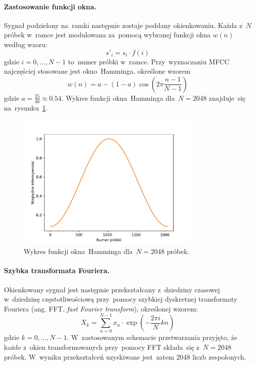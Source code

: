 \documentclass[11pt,a4paper]{article}
\begin{document}
\paragraph{Zastosowanie funkcji okna.}
Sygnał podzielony na~ramki następnie zostaje poddany okienkowaniu.
Każda z~$N$ próbek w~ramce jest modulowana za~pomocą wybranej funkcji okna $w(n)$ według wzoru:
$$ s'_i = s_i \cdot f(i) $$
gdzie $i = 0, \dots, N - 1$ to~numer próbki w~ramce.
Przy~wyznaczaniu MFCC najczęściej stosowane jest okno~Hamminga, określone wzorem
$$ w(n) = a - (1 - a) \cos \left( 2\pi \frac{n-1}{N-1} \right) $$
gdzie $a = \frac{25}{46} \approx 0.54$.
Wykres funkcji okna~Hamminga dla~$N = 2048$ znajduje~się na~rysunku~\ref{fig:hamming-window}.

\begin{figure}
    \centering
    \includegraphics[width=0.8\textwidth]{res/plots/hamming_window.pdf}
    \caption{Wykres funkcji okna~Hamminga dla~$N = 2048$ próbek.}
    \label{fig:hamming-window}
\end{figure}

\paragraph{Szybka transformata Fouriera.}
Okienkowany sygnał jest następnie przekształcany z~dziedziny czasowej w~dziedzinę częstotliwościową przy~pomocy szybkiej dyskretnej transformaty Fouriera (ang. FFT, \emph{fast Fourier transform}), określonej wzorem:
$$ X_k = \sum_{n = 0}^{N - 1} x_n \cdot \exp \left( -\frac{2 \pi i}{N} kn \right) $$
gdzie $k = 0, \dots, N - 1$.
W~zastosowanym schemacie przetwarzania przyjęto, że każde z~okien transformowanych przy~pomocy FFT składa~się z~$N = 2048$ próbek.
W~wyniku przekształceń uzyskiwane jest~zatem 2048 liczb zespolonych.
\end{document}
